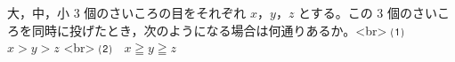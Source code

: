 大，中，小 $3$ 個のさいころの目をそれぞれ $x$，$y$，$z$ とする。この $3$ 個のさいころを同時に投げたとき，次のようになる場合は何通りあるか。<br>
⑴　$x > y > z$ <br>
⑵　$x \geqq y \geqq z$
